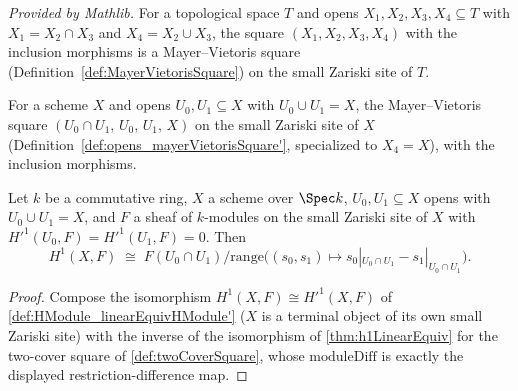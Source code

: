 \begin{definition}
  \label{def:opens_mayerVietorisSquare'}
  \mathlibok
  \textit{Provided by Mathlib.}
  For a topological space \(T\) and opens \(X_1,X_2,X_3,X_4 \subseteq T\) with
  \(X_1 = X_2 \cap X_3\) and \(X_4 = X_2 \cup X_3\), the square \((X_1,X_2,X_3,X_4)\) with the
  inclusion morphisms is a Mayer--Vietoris square (Definition~\ref{def:MayerVietorisSquare})
  on the small Zariski site of \(T\).
\end{definition}

\begin{definition}
  \label{def:twoCoverSquare}
  \leanok
  For a scheme \(X\) and opens \(U_0, U_1 \subseteq X\) with \(U_0 \cup U_1 = X\), the
  Mayer--Vietoris square \((U_0 \cap U_1,\, U_0,\, U_1,\, X)\) on the small Zariski site of
  \(X\) (Definition~\ref{def:opens_mayerVietorisSquare'}, specialized to \(X_4 = X\)), with
  the inclusion morphisms.
\end{definition}

\begin{theorem}
  \label{thm:twoCoverH1LinearEquiv}
  \leanok
  Let \(k\) be a commutative ring, \(X\) a scheme over \(\Spec k\), \(U_0, U_1 \subseteq X\)
  opens with \(U_0 \cup U_1 = X\), and \(F\) a sheaf of \(k\)-modules on the small Zariski
  site of \(X\) with \(H'^1(U_0,F) = H'^1(U_1,F) = 0\). Then
  \[
    H^1(X,F) \;\cong\;
      F(U_0 \cap U_1) \big/ \mathrm{range}\bigl((s_0,s_1) \mapsto
        s_0|_{U_0 \cap U_1} - s_1|_{U_0 \cap U_1}\bigr) .
  \]
\end{theorem}
\begin{proof}
  \leanok
  Compose the isomorphism \(H^1(X,F) \cong H'^1(X,F)\) of
  \ref{def:HModule_linearEquivHModule'} (\(X\) is a terminal object of its own small Zariski
  site) with the inverse of the isomorphism of \ref{thm:h1LinearEquiv} for the two-cover
  square of \ref{def:twoCoverSquare}, whose \(\mathrm{moduleDiff}\) is exactly the displayed
  restriction-difference map.
\end{proof}

